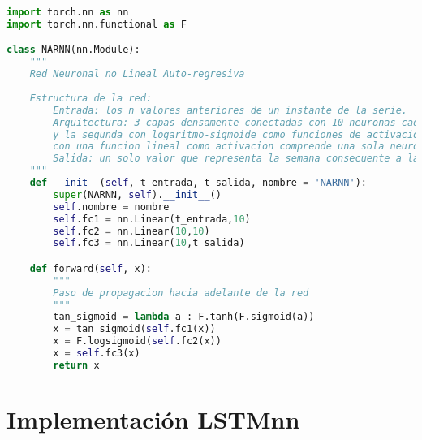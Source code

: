 \begin{lstlisting}[language=Python]
import torch.nn as nn
import torch.nn.functional as F

class NARNN(nn.Module):
    """
    Red Neuronal no Lineal Auto-regresiva
    
    Estructura de la red:
        Entrada: los n valores anteriores de un instante de la serie.
        Arquitectura: 3 capas densamente conectadas con 10 neuronas cada una. La primera con la funcion tangente-sigmode 
        y la segunda con logaritmo-sigmoide como funciones de activacion. Luego la capa de salida,
        con una funcion lineal como activacion comprende una sola neurona. 
        Salida: un solo valor que representa la semana consecuente a las n de entrada.
    """
    def __init__(self, t_entrada, t_salida, nombre = 'NARNN'):
        super(NARNN, self).__init__()
        self.nombre = nombre
        self.fc1 = nn.Linear(t_entrada,10)
        self.fc2 = nn.Linear(10,10)
        self.fc3 = nn.Linear(10,t_salida)

    def forward(self, x):
        """
        Paso de propagacion hacia adelante de la red
        """
        tan_sigmoid = lambda a : F.tanh(F.sigmoid(a))
        x = tan_sigmoid(self.fc1(x))
        x = F.logsigmoid(self.fc2(x))
        x = self.fc3(x)
        return x
\end{lstlisting}

\section{Implementación LSTMnn}

